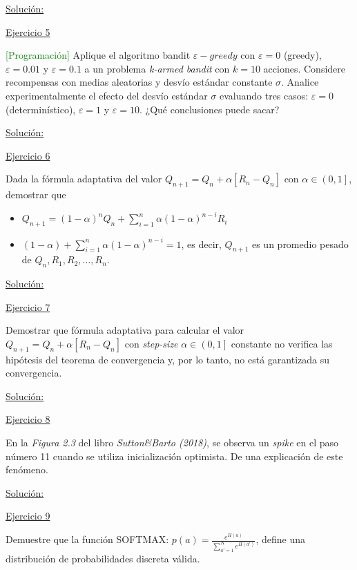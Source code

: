 \documentclass[12pt]{article}
\newlength\tindent
\renewcommand{\indent}{\hspace*{\tindent}}
\begin{document}
    \indent\underline{Solución:}

    \indent\underline{Ejercicio 5}

    \textcolor{green}{[Programación]} Aplique el algoritmo bandit $\varepsilon-greedy$ con $\varepsilon=0$ (greedy), $\varepsilon=0.01$ y $\varepsilon=0.1$ a un problema \textit{k-armed bandit} con $k=10$ acciones.
    Considere recompensas con medias aleatorias y desvío estándar constante $\sigma$.
    Analice experimentalmente el efecto del desvío estándar $\sigma$ evaluando tres casos: $\varepsilon=0$ (determinístico), $\varepsilon=1$ y $\varepsilon=10$.
    ¿Qué conclusiones puede sacar?

    \indent\underline{Solución:}

    \indent\underline{Ejercicio 6}

    Dada la fórmula adaptativa del valor $Q_{n+1}= Q_n+\alpha\left[R_{n}-Q_{n}\right]$ con $\alpha\in\left(0,1\right]$, demostrar que

    \begin{itemize}
        \item $Q_{n+1}=(1-\alpha)^{n}Q_{n} + \sum_{i=1}^n \alpha(1-\alpha)^{n-i}R_{i}$
        \item $(1-\alpha)+\sum_{i=1}^{n} \alpha(1-\alpha)^{n-i}=1$, es decir, $Q_{n+1}$ es un promedio pesado de $Q_{n},R_1,R_2,\dots,R_n$.
    \end{itemize}

    \indent\underline{Solución:}

    \indent\underline{Ejercicio 7}

    Demostrar que fórmula adaptativa para calcular el valor $Q_{n+1}=Q_n+\alpha\left[R_n-Q_n\right]$ con  \textit{step-size} $\alpha\in\left(0,1\right]$ constante no verifica las hipótesis del teorema de convergencia y, por lo tanto, no está garantizada su convergencia.

    \indent\underline{Solución:}

    \indent\underline{Ejercicio 8}

    En la \textit{Figura 2.3} del libro \textit{Sutton\&Barto (2018)}, se observa un \textit{spike} en el paso número 11 cuando se utiliza inicialización optimista.
    De una explicación de este fenómeno.

    \indent\underline{Solución:}

    \indent\underline{Ejercicio 9}

    Demuestre que la función SOFTMAX: $p(a)=\frac{e^{H(a)}}{\sum_{a'=1}^{K} e^{H(a')}}$, define una distribución de probabilidades discreta válida.
\end{document}
